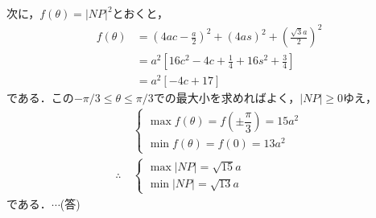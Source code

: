 \documentclass[a4j]{jarticle}
\begin{document}
\begin{multicols}{2}
次に，$f(\theta)=|NP|^2$とおくと，
     \begin{align*}
     f(\theta)&=\left(4ac-\frac{a}{2}\right)^2+(4as)^2+\left(\frac{\sqrt{3}a}{2}\right)^2 \\
     &=a^2\left[16c^2-4c+\frac{1}{4}+16s^2+\frac{3}{4}\right] \\
     &=a^2\left[-4c+17\right]
     \end{align*}
である．この$-\pi/3\le\theta\le\pi/3$での最大小を求めればよく，$|NP|\ge0$ゆえ，
     \begin{align*}
          &\begin{cases}
          \max f(\theta)=f\left(\pm\dfrac{\pi}{3}\right)=15a^2 \\
          \min f(\theta)=f(0)=13a^2
          \end{cases} \\
     \therefore \ 
          &\begin{cases}
          \max |NP|=\sqrt{15}a \\
          \min |NP|=\sqrt{13}a
          \end{cases} 
     \end{align*}
である．$\cdots$(答)
\newpage
\end{multicols}
\end{document}
